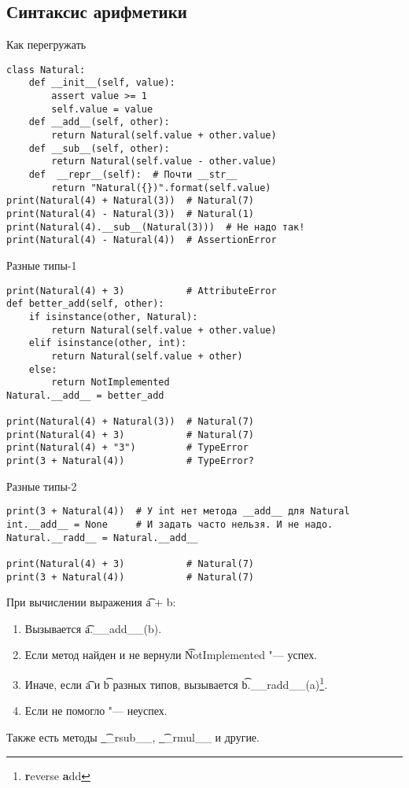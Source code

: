 \subsection{Синтаксис арифметики}

\begin{frame}
\end{frame}

\begin{frame}[fragile]{Как перегружать}
\begin{verbatim}
class Natural:
    def __init__(self, value):
        assert value >= 1
        self.value = value
    def __add__(self, other):
        return Natural(self.value + other.value)
    def __sub__(self, other):
        return Natural(self.value - other.value)
    def  __repr__(self):  # Почти __str__
        return "Natural({})".format(self.value)
print(Natural(4) + Natural(3))  # Natural(7)
print(Natural(4) - Natural(3))  # Natural(1)
print(Natural(4).__sub__(Natural(3)))  # Не надо так!
print(Natural(4) - Natural(4))  # AssertionError
\end{verbatim}
\end{frame}

\begin{frame}[fragile]{Разные типы-1}
\begin{verbatim}
print(Natural(4) + 3)           # AttributeError
def better_add(self, other):
    if isinstance(other, Natural):
        return Natural(self.value + other.value)
    elif isinstance(other, int):
        return Natural(self.value + other)
    else:
        return NotImplemented
Natural.__add__ = better_add

print(Natural(4) + Natural(3))  # Natural(7)
print(Natural(4) + 3)           # Natural(7)
print(Natural(4) + "3")         # TypeError
print(3 + Natural(4))           # TypeError?
\end{verbatim}
\end{frame}

\begin{frame}[fragile]{Разные типы-2}
\begin{verbatim}
print(3 + Natural(4))  # У int нет метода __add__ для Natural
int.__add__ = None     # И задать часто нельзя. И не надо.
Natural.__radd__ = Natural.__add__

print(Natural(4) + 3)           # Natural(7)
print(3 + Natural(4))           # Natural(7)
\end{verbatim}

	При вычислении выражения \t{a + b}:
	\begin{enumerate}
		\item Вызывается \t{a.\_\_add\_\_(b)}.
		\item Если метод найден и не вернули \t{NotImplemented} "--- успех.
		\item Иначе, если \t{a} и \t{b} разных типов, вызывается \t{b.\_\_radd\_\_(a)}\footnote{\textbf{r}everse \textbf{a}dd}.
		\item Если не помогло "--- неуспех.
	\end{enumerate}

	Также есть методы \t{\_\_rsub\_\_}, \t{\_\_rmul\_\_} и другие.
\end{frame}

